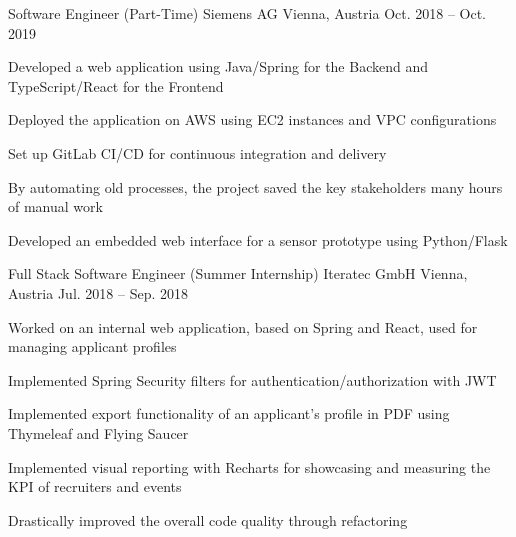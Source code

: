 


\begin{cventries}


\cventry
{Software Engineer (Part-Time)} %
{Siemens AG} %
{Vienna, Austria} %
{Oct. 2018 -- Oct. 2019} %
{ %
\begin{cvitems}
\item {Developed a web application using Java/Spring for the Backend and TypeScript/React for the Frontend}
\item {Deployed the application on AWS using EC2 instances and VPC configurations}
\item {Set up GitLab CI/CD for continuous integration and delivery}
\item {By automating old processes, the project saved the key stakeholders many hours of manual work}
\item {Developed an embedded web interface for a sensor prototype using Python/Flask}
\end{cvitems}
}


\cventry
{Full Stack Software Engineer (Summer Internship)} %
{Iteratec GmbH} %
{Vienna, Austria} %
{Jul. 2018 -- Sep. 2018} %
{ %
\begin{cvitems}
\item {Worked on an internal web application, based on Spring and React, used for managing applicant profiles}
\item {Implemented Spring Security filters for authentication/authorization with JWT}
\item {Implemented export functionality of an applicant's profile in PDF using Thymeleaf and Flying Saucer}
\item {Implemented visual reporting with Recharts for showcasing and measuring the KPI of recruiters and events}
\item {Drastically improved the overall code quality through refactoring}
\end{cvitems}
}


\end{cventries}
